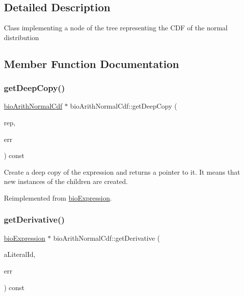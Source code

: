 \subsection{Detailed Description}
Class implementing a node of the tree representing the C\+DF of the normal distribution 

\subsection{Member Function Documentation}
\mbox{\label{classbio_arith_normal_cdf_ae88a5f7d19f32cc5daf01152931e9c62}} 
\subsubsection{\texorpdfstring{get\+Deep\+Copy()}{getDeepCopy()}}
{\footnotesize\ttfamily \hyperlink{classbio_arith_normal_cdf}{bio\+Arith\+Normal\+Cdf} $\ast$ bio\+Arith\+Normal\+Cdf\+::get\+Deep\+Copy (\begin{DoxyParamCaption}\item[{\hyperlink{classbio_expression_repository}{bio\+Expression\+Repository} $\ast$}]{rep,  }\item[{pat\+Error $\ast$\&}]{err }\end{DoxyParamCaption}) const\hspace{0.3cm}{\ttfamily [virtual]}}

Create a deep copy of the expression and returns a pointer to it. It means that new instances of the children are created. 

Reimplemented from \hyperlink{classbio_expression_a4ee1b8add634078a02eaae26cd40dcc8}{bio\+Expression}.

\mbox{\label{classbio_arith_normal_cdf_adf643b1adb105be0728b921cd96d555f}} 
\subsubsection{\texorpdfstring{get\+Derivative()}{getDerivative()}}
{\footnotesize\ttfamily \hyperlink{classbio_expression}{bio\+Expression} $\ast$ bio\+Arith\+Normal\+Cdf\+::get\+Derivative (\begin{DoxyParamCaption}\item[{pat\+U\+Long}]{a\+Literal\+Id,  }\item[{pat\+Error $\ast$\&}]{err }\end{DoxyParamCaption}) const\hspace{0.3cm}{\ttfamily [virtual]}}

